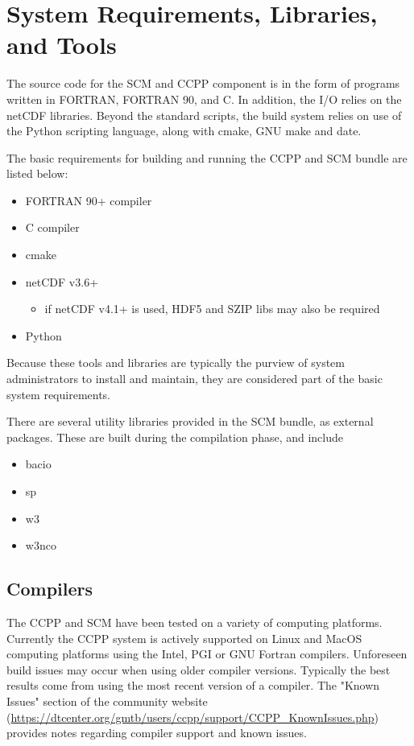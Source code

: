 \section{System Requirements, Libraries, and Tools}
\label{section: systemrequirements}

The source code for the SCM and CCPP component is in the form
of programs written in FORTRAN, FORTRAN 90, and C. In addition, the I/O relies on the netCDF
libraries. Beyond the standard scripts, the build system relies
on use of the Python scripting language, along with cmake, GNU make and date.

The basic requirements for building and running the CCPP and SCM bundle are
listed below:

\begin{itemize}
	\item FORTRAN 90+ compiler
	\item C compiler
	\item cmake 
	\item netCDF v3.6+
        \begin{itemize}
	\item if netCDF v4.1+ is used, HDF5 and SZIP libs may also be required
\end{itemize}
	\item Python
\end{itemize}


Because these tools and libraries are typically the purview of
system administrators to install and maintain, they are considered 
part of the basic system requirements.


There are several utility libraries provided in the SCM bundle, as external packages.  These
are built during the compilation phase, and include


\begin{itemize}
	\item bacio
	\item sp
	\item w3
	\item w3nco
\end{itemize}



\subsection{Compilers}
The CCPP and SCM have been tested on a variety of
computing platforms. Currently the CCPP system is actively supported
on Linux and MacOS computing platforms using the Intel, PGI or GNU Fortran
compilers. Unforeseen build issues may occur when using older
compiler versions. Typically the best results come from using the
most recent version of a compiler. The "Known Issues" section of the
community website (\url{https://dtcenter.org/gmtb/users/ccpp/support/CCPP_KnownIssues.php}) provides notes regarding compiler support and known issues.




